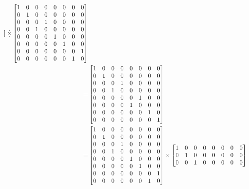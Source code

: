 \documentclass[en]{sol-man}
\begin{document}
\begin{sol}
\begin{itemize}
\begin{pf}
\begin{align}
\begin{bmatrix}
                \end{bmatrix}\times\begin{bmatrix}
                    1&0&0&0&0&0&0&0\\
                    0&1&0&0&0&0&0&0\\
                    0&0&0&1&0&0&0&0\\
                    0&0&1&0&0&0&0&0\\
                    0&0&0&0&1&0&0&0\\
                    0&0&0&0&0&1&0&0\\
                    0&0&0&0&0&0&0&1\\
                    0&0&0&0&0&0&1&0
                \end{bmatrix}\\
                \notag=&\begin{bmatrix}
                    1&0&0&0&0&0&0&0\\
                    0&1&0&0&0&0&0&0\\
                    0&0&0&1&0&0&0&0\\
                    0&0&1&0&0&0&0&0\\
                    0&0&0&0&0&1&0&0\\
                    0&0&0&0&1&0&0&0\\
                    0&0&0&0&0&0&1&0\\
                    0&0&0&0&0&0&0&1
                \end{bmatrix}\\
                =&\begin{bmatrix}
                    1&0&0&0&0&0&0&0\\
                    0&1&0&0&0&0&0&0\\
                    0&0&0&1&0&0&0&0\\
                    0&0&1&0&0&0&0&0\\
                    0&0&0&0&1&0&0&0\\
                    0&0&0&0&0&1&0&0\\
                    0&0&0&0&0&0&0&1\\
                    0&0&0&0&0&0&1&0
                \end{bmatrix}\times\begin{bmatrix}
                    1&0&0&0&0&0&0&0\\
                    0&1&0&0&0&0&0&0\\
                    0&0&1&0&0&0&0&0\\

\end{bmatrix}
\end{align}
\end{pf}
\end{itemize}
\end{sol}
\end{document}
